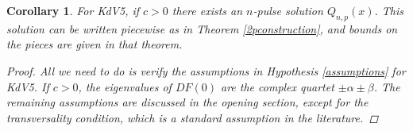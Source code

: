 \documentclass[12pt]{article}
\newtheorem{corollary}{Corollary}
\begin{document}

\begin{corollary}
For KdV5, if $c > 0$ there exists an $n$-pulse solution $Q_{n, p}(x)$. This solution can be written piecewise as in Theorem \ref{2pconstruction}, and bounds on the pieces are given in that theorem.

\begin{proof}
All we need to do is verify the assumptions in Hypothesis \ref{assumptions} for KdV5. If $c > 0$, the eigenvalues of $DF(0)$ are the complex quartet $\pm \alpha \pm \beta$. The remaining assumptions are discussed in the opening section, except for the transversality condition, which is a standard assumption in the literature.
\end{proof}

\end{corollary}
\end{document}
